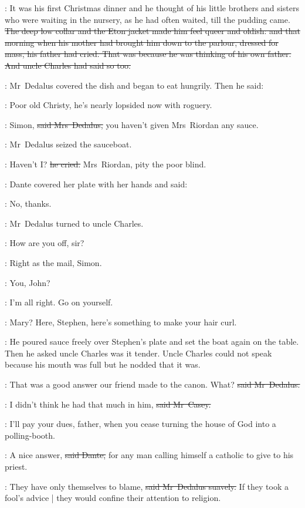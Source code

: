 :
It was his first Christmas dinner
and he thought of his little brothers and sisters
who were waiting in the nursery,
as he had often waited,
till the pudding came.
\sout{The deep low collar and the Eton jacket
made him feel queer and oldish:
and that morning
when his mother had brought him down to the parlour,
dressed for mass,
his father had cried.
That was because he was thinking of his own father.
And uncle Charles had said so too.}

:
Mr~Dedalus covered the dish
and began to eat hungrily.
Then he said:

\simon:
Poor old Christy,
he’s nearly lopsided now with roguery.

\marydedalus:
Simon,
\sout{said Mrs~Dedalus,}
you haven’t given Mrs~Riordan any sauce.

:
Mr~Dedalus seized the sauceboat.

\simon:
Haven’t I?
\sout{he cried.}
Mrs~Riordan,
pity the poor blind.

:
Dante covered her plate with her hands and said:

\dante:
No, thanks.

:
Mr~Dedalus turned to uncle Charles.

\simon:
How are you off, sir?

\charles:
Right as the mail, Simon.

\simon:
You, John?

\casey:
I’m all right.
Go on yourself.

\simon:
Mary?
Here, Stephen,
here’s something to make your hair curl.

:
He poured sauce freely over Stephen’s plate
and set the boat again on the table.
Then he asked uncle Charles was it tender.
Uncle Charles could not speak
because his mouth was full
but he nodded that it was.

\simon:
That was a good answer
our friend made to the canon.
What?
\sout{said Mr~Dedalus.}

\casey:
I didn’t think he had that much in him,
\sout{said Mr~Casey.}

\casey:
\stage{[as parishioner]}
I’ll pay your dues,
father,
when you cease turning the house of God into a polling-booth.

\dante:
A nice answer,
\sout{said Dante,}
for any man calling himself a catholic to give to his priest.

\simon:
They have only themselves to blame,
\sout{said Mr~Dedalus suavely.}
If they took a fool’s advice |
they would confine their attention to religion.

